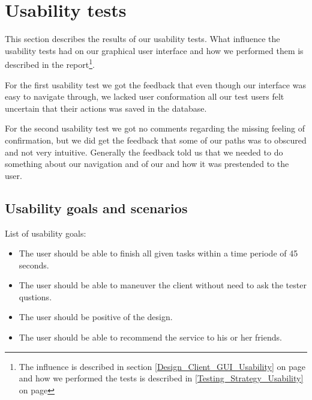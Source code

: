 \section{Usability tests}
\label{Appendix_Test_Usability}
This section describes the results of our usability tests. What influence the usability tests had on our graphical user interface and how we performed them is described in the report\footnote{The influence is described in section \ref {Design_Client_GUI_Usability} on page \pageref{Design_Client_GUI_Usability} and how we performed the tests is described in \ref{Testing_Strategy_Usability} on page \pageref{Testing_Strategy_Usability}}.

For the first usability test we got the feedback that even though our interface was easy to navigate through, we lacked user conformation all our test users felt uncertain that their actions was saved in the database.

For the second usability test we got no comments regarding the missing feeling of confirmation, but we did get the feedback that some of our paths was to obscured and not very intuitive. Generally the feedback told us that we needed to do something about our navigation and of our and how it was prestended to the user.


\subsection{Usability goals and scenarios}
\label{Appendix_Test_Usability_GoalsandScenario}

List of usability goals:
\begin{itemize}\addtolength{\itemsep}{-5pt}
\item The user should be able to finish all given tasks within a time periode of 45 seconds.
\item The user should be able to maneuver the client without need to ask the tester qustions.
\item The user should be positive of the design.
\item The user should be able to recommend the service to his or her friends.
\end {itemize}

